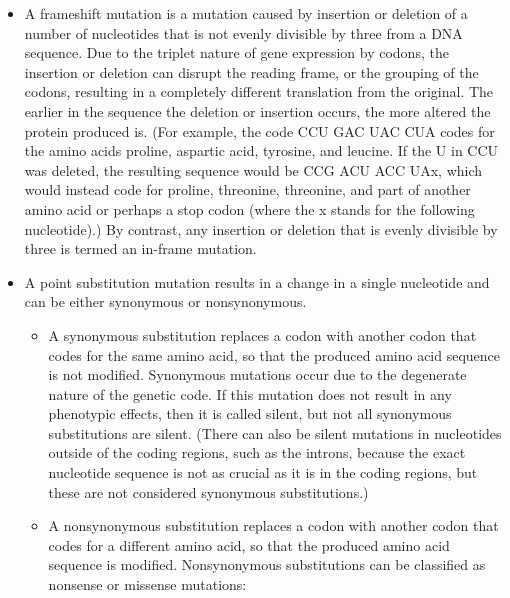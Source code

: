 \begin{itemize}
\tightlist
\item
  A frameshift mutation is a mutation caused by insertion or deletion of a number of nucleotides that is not evenly divisible by three from a DNA sequence. Due to the triplet nature of gene expression by codons, the insertion or deletion can disrupt the reading frame, or the grouping of the codons, resulting in a completely different translation from the original. The earlier in the sequence the deletion or insertion occurs, the more altered the protein produced is. (For example, the code CCU GAC UAC CUA codes for the amino acids proline, aspartic acid, tyrosine, and leucine. If the U in CCU was deleted, the resulting sequence would be CCG ACU ACC UAx, which would instead code for proline, threonine, threonine, and part of another amino acid or perhaps a stop codon (where the x stands for the following nucleotide).) By contrast, any insertion or deletion that is evenly divisible by three is termed an in-frame mutation.
\item
  A point substitution mutation results in a change in a single nucleotide and can be either synonymous or nonsynonymous.

  \begin{itemize}
  \tightlist
  \item
    A synonymous substitution replaces a codon with another codon that codes for the same amino acid, so that the produced amino acid sequence is not modified. Synonymous mutations occur due to the degenerate nature of the genetic code. If this mutation does not result in any phenotypic effects, then it is called silent, but not all synonymous substitutions are silent. (There can also be silent mutations in nucleotides outside of the coding regions, such as the introns, because the exact nucleotide sequence is not as crucial as it is in the coding regions, but these are not considered synonymous substitutions.)
  \item
    A nonsynonymous substitution replaces a codon with another codon that codes for a different amino acid, so that the produced amino acid sequence is modified. Nonsynonymous substitutions can be classified as nonsense or missense mutations:


\end{itemize}
\end{itemize}
